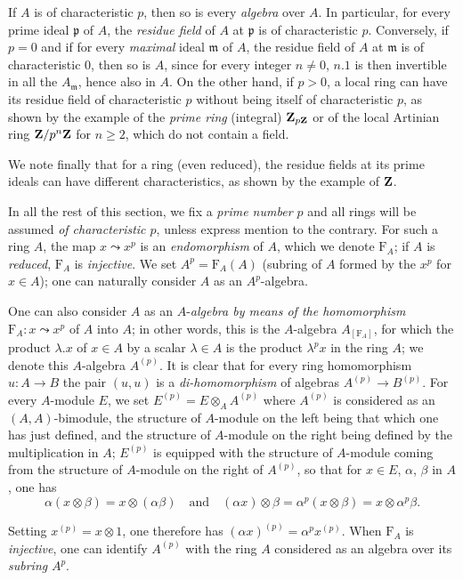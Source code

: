 \begin{env}[21.1.3]
\label{0.21.1.3}
If $A$ is of characteristic $p$, then so is every \emph{algebra} over $A$.
In particular, for every prime ideal $\mathfrak{p}$ of $A$, the \emph{residue field} of $A$ at $\mathfrak{p}$ is of characteristic $p$.
Conversely, if $p=0$ and if for every \emph{maximal} ideal $\mathfrak{m}$ of $A$, the residue field of $A$ at $\mathfrak{m}$ is of characteristic $0$, then so is $A$, since for every integer $n\neq 0$, $n.1$ is then invertible in all the $A_\mathfrak{m}$, hence also in $A$.
On the other hand, if $p>0$, a local ring can have its residue field of characteristic $p$ without being itself of characteristic $p$, as shown by the example of the \emph{prime ring} (integral) $\mathbf{Z}_{p\mathbf{Z}}$  or of the local Artinian ring $\mathbf{Z}/p^n\mathbf{Z}$ for $n\geq 2$, which do not contain a field.

We note finally that for a ring (even reduced), the residue fields at its prime ideals can have different characteristics, as shown by the example of $\mathbf{Z}$.
\end{env}

\begin{env}[21.1.4]
\label{0.21.1.4}
In all the rest of this section, we fix a \emph{prime number $p$} and all rings will be assumed \emph{of characteristic $p$}, unless express mention to the contrary.
For such a ring $A$, the map $x\leadsto x^p$ is an \emph{endomorphism} of $A$, which we denote $\mathrm{F}_A$; if $A$ is \emph{reduced}, $\mathrm{F}_A$ is \emph{injective}.
We set $A^p=\mathrm{F}_A(A)$ (subring of $A$ formed by the $x^p$ for $x\in A$); one can naturally consider $A$ as an $A^p$-algebra.

One can also consider $A$ as an $A$-\emph{algebra by means of the homomorphism} $\mathrm{F}_A:x\leadsto x^p$ of $A$ into $A$; in other words, this is the $A$-algebra $A_{[\mathrm{F}_A]}$, for which the product $\lambda.x$ of $x\in A$ by a scalar $\lambda\in A$ is the product $\lambda^p x$ in the ring $A$; we denote this $A$-algebra $A^{(p)}$.
It is clear that for every ring homomorphism $u:A\to B$ the pair $(u,u)$ is a \emph{di-homomorphism} of algebras $A^{(p)}\to B^{(p)}$.
For every $A$-module $E$, we set $E^{(p)}=E\otimes_A A^{(p)}$ where $A^{(p)}$ is considered as an $(A,A)$-bimodule, the structure of $A$-module on the left being that which one has just defined, and the structure of $A$-module on the right being defined by the multiplication in $A$; $E^{(p)}$ is equipped with the structure of $A$-module coming from the structure of $A$-module on the right of $A^{(p)}$, so that for $x\in E$, $\alpha$, $\beta$ in $A$, one has
\[
  \alpha(x\otimes\beta)=x\otimes(\alpha\beta) \quad\text{and}\quad (\alpha x)\otimes\beta=\alpha^p(x\otimes\beta)=x\otimes\alpha^p\beta.
\]

Setting $x^{(p)}=x\otimes 1$, one therefore has $(\alpha x)^{(p)}=\alpha^p x^{(p)}$.
When $\mathrm{F}_A$ is \emph{injective}, one can identify $A^{(p)}$ with the ring $A$ considered as an algebra over its \emph{subring} $A^p$.
\end{env}


